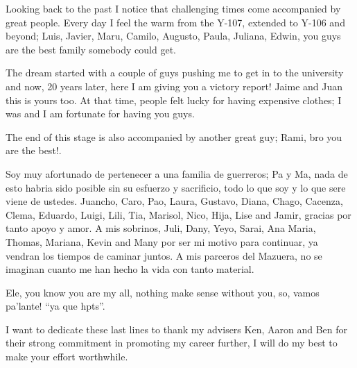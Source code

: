 Looking back to the past I notice that challenging times come accompanied by great people. Every day I feel the warm from the Y-107, extended to Y-106 and beyond; Luis, Javier, Maru, Camilo, Augusto, Paula, Juliana, Edwin, you guys are the best family somebody could get.    

The dream started with a couple of guys pushing me to get in to the university and now, 20 years later, here I am giving you a victory report! Jaime and Juan this is yours too. At that time, people felt lucky for having expensive clothes; I was and I am fortunate for having you guys.

The end of this stage is also accompanied by another great guy; Rami, bro you are the best!.

Soy muy afortunado de pertenecer a una familia de guerreros; Pa y Ma, nada de esto habria sido posible sin su esfuerzo y sacrificio, todo lo que soy y lo que sere viene de ustedes. Juancho, Caro, Pao, Laura, Gustavo, Diana, Chago, Cacenza, Clema, Eduardo, Luigi, Lili, Tia, Marisol, Nico, Hija, Lise and Jamir, gracias por tanto apoyo y amor. A mis sobrinos, Juli, Dany, Yeyo, Sarai, Ana Maria, Thomas, Mariana, Kevin and Many por ser mi motivo para continuar, ya vendran los tiempos de caminar juntos. A mis parceros del Mazuera, no se imaginan cuanto me han hecho la vida con tanto material.

Ele, you know you are my all, nothing make sense without you, so, vamos pa'lante! ``ya que hpts''.  

I want to dedicate these last lines to thank my advisers Ken, Aaron and Ben for their strong commitment in promoting my career further, I will do my best to make your effort worthwhile.   






